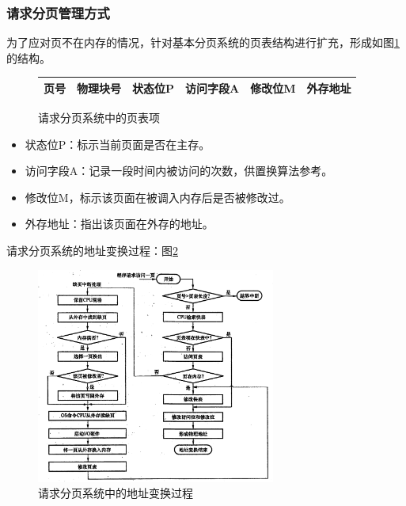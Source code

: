 \documentclass[12pt, a4paper, oneside]{ctexart}
\begin{document}
\subsubsection{请求分页管理方式}

为了应对页不在内存的情况，针对基本分页系统的页表结构进行扩充，形成如图\ref{page_request_system}的结构。

\begin{figure}[h]
  \centering
  \begin{tabular}{|c|c|c|c|c|c|}
    \hline
    页号 & 物理块号 & 状态位P & 访问字段A & 修改位M & 外存地址 \\
    \hline
  \end{tabular}
  \caption{请求分页系统中的页表项}
  \label{page_request_system}
\end{figure}

\begin{itemize}
  \item 状态位P：标示当前页面是否在主存。
  \item 访问字段A：记录一段时间内被访问的次数，供置换算法参考。
  \item 修改位M，标示该页面在被调入内存后是否被修改过。
  \item 外存地址：指出该页面在外存的地址。
\end{itemize}

请求分页系统的地址变换过程：图\ref{page_request_address_translation}

\begin{figure}
  \centering
  \includegraphics[width=0.7\textwidth]{./images/page_request_address_translation.png}
  \caption{请求分页系统中的地址变换过程}
  \label{page_request_address_translation}
\end{figure}
\end{document}
